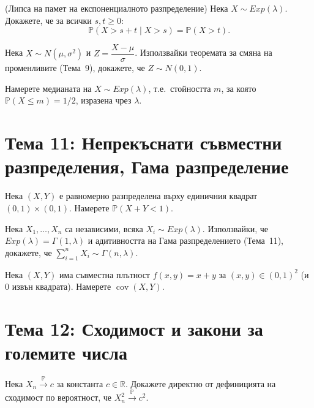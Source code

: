 \begin{probbox}[Задача 10.1]
(Липса на памет на експоненциалното разпределение) Нека $X\sim
Exp(\lambda)$. Докажете, че за всички $s,t\ge0$:
\[
  \mathbb P(X>s+t\mid X>s) = \mathbb P(X>t).
\]
\end{probbox}

\begin{probbox}[Задача 10.2]
Нека $X\sim N(\mu,\sigma^2)$ и $Z=\dfrac{X-\mu}\sigma$. Използвайки
теоремата за смяна на променливите (Тема~9), докажете, че $Z\sim
N(0,1)$.
\end{probbox}

\begin{probbox}[Задача 10.3]
Намерете медианата на $X\sim Exp(\lambda)$, т.е.\ стойността $m$,
за която $\mathbb P(X\le m)=1/2$, изразена чрез $\lambda$.
\end{probbox}

\section*{Тема 11: Непрекъснати съвместни разпределения, Гама разпределение}

\begin{probbox}[Задача 11.1]
Нека $(X,Y)$ е равномерно разпределена върху единичния квадрат
$(0,1)\times(0,1)$. Намерете $\mathbb P(X+Y<1)$.
\end{probbox}

\begin{probbox}[Задача 11.2]
Нека $X_1,\dots,X_n$ са независими, всяка $X_i\sim Exp(\lambda)$.
Използвайки, че $Exp(\lambda)=\Gamma(1,\lambda)$ и адитивността на
Гама разпределението (Тема~11), докажете, че $\sum_{i=1}^n X_i \sim
\Gamma(n,\lambda)$.
\end{probbox}

\begin{probbox}[Задача 11.3]
Нека $(X,Y)$ има съвместна плътност $f(x,y)=x+y$ за $(x,y)\in(0,1)^2$
(и $0$ извън квадрата). Намерете $\operatorname{cov}(X,Y)$.
\end{probbox}

\section*{Тема 12: Сходимост и закони за големите числа}

\begin{probbox}[Задача 12.1]
Нека $X_n\xrightarrow{\mathbb P}c$ за константа $c\in\mathbb R$.
Докажете директно от дефиницията на сходимост по вероятност, че
$X_n^2\xrightarrow{\mathbb P}c^2$.
\end{probbox}

